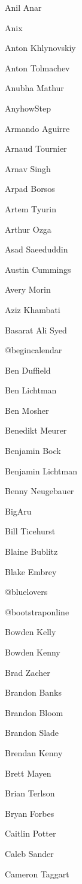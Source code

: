 \begin{DoxyItemize}
\item Anil Anar
\item Anix
\item Anton Khlynovskiy
\item Anton Tolmachev
\item Anubha Mathur
\item Anyhow\+Step
\item Armando Aguirre
\item Arnaud Tournier
\item Arnav Singh
\item Arpad Borsos
\item Artem Tyurin
\item Arthur Ozga
\item Asad Saeeduddin
\item Austin Cummings
\item Avery Morin
\item Aziz Khambati
\item Basarat Ali Syed
\item @begincalendar
\item Ben Duffield
\item Ben Lichtman
\item Ben Mosher
\item Benedikt Meurer
\item Benjamin Bock
\item Benjamin Lichtman
\item Benny Neugebauer
\item Big\+Aru
\item Bill Ticehurst
\item Blaine Bublitz
\item Blake Embrey
\item @bluelovers
\item @bootstraponline
\item Bowden Kelly
\item Bowden Kenny
\item Brad Zacher
\item Brandon Banks
\item Brandon Bloom
\item Brandon Slade
\item Brendan Kenny
\item Brett Mayen
\item Brian Terlson
\item Bryan Forbes
\item Caitlin Potter
\item Caleb Sander
\item Cameron Taggart

\end{DoxyItemize}
